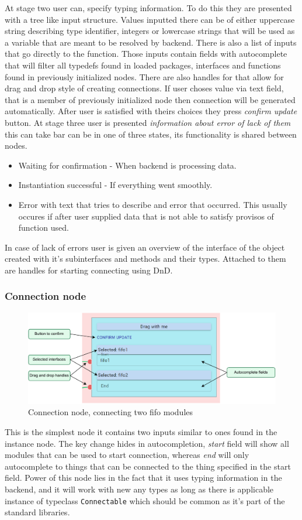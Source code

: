 \documentclass[12pt]{report}
\begin{document}
At stage two user can, specify typing information. To do this they are presented with a tree like input structure. Values inputted there can be of either uppercase string describing type identifier, integers or lowercase strings that will be used as a variable that are meant to be resolved by backend. There is also a list of inputs that go directly to the function. Those inputs contain fields with autocomplete that will filter all typedefs found in loaded packages, interfaces and functions found in previously initialized nodes. There are also handles for that allow for drag and drop style of creating connections. If user choses value via text field, that is a member of previously initialized node then connection will be generated automatically.
After user is satisfied with theirs choices they press \emph{confirm update} button.
At stage three user is presented \emph{information about error of lack of them} this can take bar can be in one of three states, its functionality is shared between nodes.
\begin{itemize}
    \item Waiting for confirmation - When backend is processing data.
    \item Instantiation successful - If everything went smoothly.
    \item Error with text that tries to describe and error that occurred. This usually occures if after user supplied data that is not able to satisfy provisos of function used.
\end{itemize} 
In case of lack of errors user is given an overview of the interface of the object created with it's subinterfaces and methods and their types. Attached to them are handles for starting connecting using DnD.
\newpage
\subsubsection{Connection node}
\begin{figure}[!h]
    \centering
    
    \includegraphics[width=1\columnwidth]{pdfExports/LargeMap-ConnectionNode.drawio.pdf}
    \caption{Connection node, connecting two fifo modules}
\end{figure}
This is the simplest node it contains two inputs similar to ones found in the instance node. The key change hides in autocompletion, \emph{start} field will show all modules that can be used to start connection, whereas \emph{end} will only autocomplete to things that can be connected to the thing specified in the start field. Power of this node lies in the fact that it uses typing information in the backend, and it will work with new any types as long as there is applicable instance of typeclass \verb!Connectable! which should be common as it's part of the standard libraries.
\end{document}
